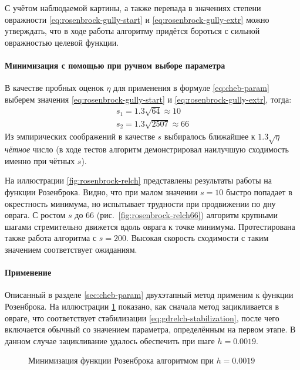 С учётом наблюдаемой картины, а также перепада в значениях
степени овражности \eqref{eq:rosenbrock-gully-start} и
\eqref{eq:rosenbrock-gully-extr} можно утверждать, что в ходе работы
алгоритму придётся бороться с сильной овражностью целевой функции.

\paragraph{Минимизация с помощью \relch{} при ручном выборе параметра}

В качестве пробных оценок $\eta$ для применения в формуле
\eqref{eq:cheb-param} выберем значения
\eqref{eq:rosenbrock-gully-start} и \eqref{eq:rosenbrock-gully-extr}, тогда:
\begin{gather*}
  s_1 = 1.3 \sqrt{64} \approx 10 \\
  s_2 = 1.3 \sqrt{2507} \approx 66
\end{gather*}
Из эмпирических соображений в качестве $s$ выбиралось ближайшее к
$1.3\sqrt{\eta}$ \emph{чётное} число (в ходе тестов алгоритм
демонстрировал наилучшую сходимость именно при чётных $s$).

На иллюстрации \ref{fig:rosenbrock-relch} представлены результаты
работы \relch{} на функции Розенброка. Видно, что при малом значении
$s=10$ \relch{} быстро попадает в окрестность минимума, но испытывает
трудности при продвижении по дну оврага. С ростом $s$ до 66
(рис. \ref{fig:rosenbrock-relch66}) алгоритм крупными шагами
стремительно движется вдоль оврага к точке минимума. Протестирована
также работа алгоритма с $s=200$. Высокая скорость сходимости с таким
значением соответствует ожиданиям.

\paragraph{Применение \gdrelch{}}

Описанный в разделе \ref{sec:cheb-param} двухэтапный метод \gdrelch{}
применим к функции Розенброка. На иллюстрации
\ref{fig:rosenbrock-gdrelch} показано, как сначала метод \gd{}
зацикливается в овраге, что соответствует стабилизации
\eqref{eq:gdrelch-stabilization}, после чего включается обычный
\relch{} со значением параметра, определённым на первом этапе. В
данном случае зацикливание \gd{} удалось обеспечить при шаге
$h=0.0019$.

\begin{figure}[thb]
  \centering
  \caption[\gdrelch{} на функции Розенброка, $h=0.0019$]{Минимизация
    функции Розенброка алгоритмом \gdrelch{} при $h=0.0019$}
  \label{fig:rosenbrock-gdrelch}
\end{figure}

